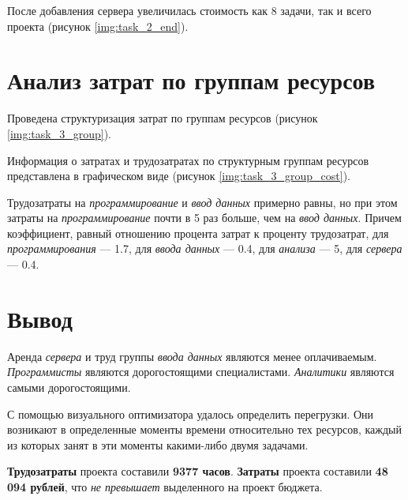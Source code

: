 После добавления сервера увеличилась стоимость как 8 задачи, так и всего проекта (рисунок \ref{img:task_2_end}).

\clearpage
\section{Анализ затрат по группам ресурсов}
Проведена структуризация затрат по группам ресурсов (рисунок \ref{img:task_3_group}).

Информация о затратах и трудозатратах по структурным группам ресурсов представлена в 
графическом виде (рисунок \ref{img:task_3_group_cost}).

\newpage
Трудозатраты на \textit{программирование} и \textit{ввод данных} примерно равны, но при этом затраты на \textit{программирование}
почти в 5 раз больше, чем на \textit{ввод данных}. Причем коэффициент, равный отношению процента затрат к 
проценту трудозатрат, для \textit{программирования} --- 1.7, для \textit{ввода данных} --- 0.4, для  \textit{анализа} --- 5, для \textit{сервера} --- 0.4.

\section{Вывод}

Аренда \textit{сервера} и труд группы \textit{ввода данных} являются менее оплачиваемым. \textit{Программисты} являются дорогостоящими специалистами.
\textit{Аналитики} являются самыми дорогостоящими. 

С помощью визуального оптимизатора удалось определить перегрузки. Они возникают в
определенные моменты времени относительно тех ресурсов, каждый из которых 
занят в эти моменты какими-либо двумя задачами.

\textbf{Трудозатраты} проекта составили \textbf{9377 часов}. \textbf{Затраты} проекта составили \textbf{48 094 рублей}, что \textit{не превышает} выделенного на проект бюджета.
